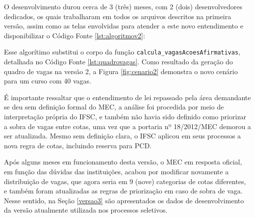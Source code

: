 \newpage
O desenvolvimento durou cerca de 3 (três) meses, com 2 (dois) desenvolvedores dedicados, os quais trabalharam em todos os arquivos descritos na primeira versão, assim como as telas envolvidas para atender a este novo entendimento e disponibilizar o Código Fonte \ref{lst:algoritmov2}:



Esse algorítimo substitui o corpo da função \texttt{calcula\_vagasAcoesAfirmativas}, detalhada no Código Fonte \ref{lst:quadrovagas}. Como resultado da geração do quadro de vagas na versão 2, a Figura \ref{fig:cenario2} demonstra o novo cenário para um curso com 40 vagas.



É importante ressaltar que o entendimento de lei repassado pela área demandante se deu sem definição formal do \gls{MEC}, a análise foi procedida por meio de interpretação própria do \gls{IFSC}, e também não havia sido definido como priorizar a sobra de vagas entre cotas, uma vez que a portaria nº 18/2012/MEC  demorou a ser atualizada. Mesmo sem definição clara, o \gls{IFSC} aplicou em seus processos a nova regra de cotas, incluindo reserva para \gls{PCD}.

Após alguns meses em funcionamento desta versão, o \gls{MEC} em resposta oficial, em função das dúvidas das instituições, acabou por modificar novamente a distribuição de vagas, que agora seria em 9 (nove) categorias de cotas diferentes, e também foram atualizadas as regras de priorização em caso de sobra de vaga. Nesse sentido, na Seção \ref{versao3} são apresentados os dados de desenvolvimento da versão atualmente utilizada nos processos seletivos.